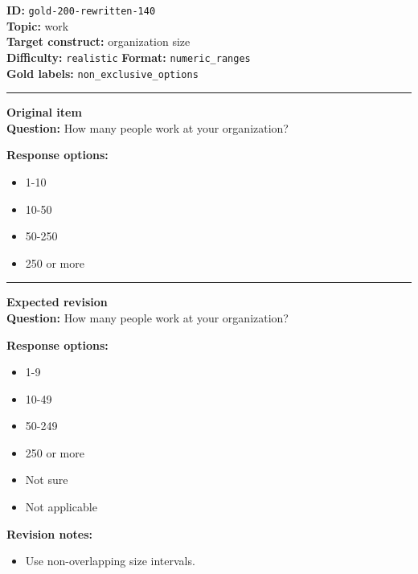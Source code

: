 \documentclass[10pt,a4paper]{article}
\newcommand{\sectionline}{\vspace{0.15em}\hrule\vspace{0.35em}}
\begin{document}
\begin{tcolorbox}[colframe=FlawRed,colback=white,colbacktitle=FlawRed!9,coltitle=black,title={Item 140\hfill Flawed item}]
\textbf{ID:} \texttt{gold-200-rewritten-140}\\
\textbf{Topic:} work\\
\textbf{Target construct:} organization size\\
\textbf{Difficulty:} \texttt{realistic} \quad \textbf{Format:} \texttt{numeric\_ranges}\\
\textbf{Gold labels:} \texttt{non\_exclusive\_options}\\
\sectionline
\textbf{Original item}\\
\textbf{Question:} How many people work at your organization?
\par\textbf{Response options:}
\begin{itemize}
\item 1-10
\item 10-50
\item 50-250
\item 250 or more
\end{itemize}
\sectionline
\textbf{Expected revision}\\
\textbf{Question:} How many people work at your organization?
\par\textbf{Response options:}
\begin{itemize}
\item 1-9
\item 10-49
\item 50-249
\item 250 or more
\item Not sure
\item Not applicable
\end{itemize}
\par\textbf{Revision notes:}
\begin{itemize}
\item Use non-overlapping size intervals.
\end{itemize}
\end{tcolorbox}
\end{document}
